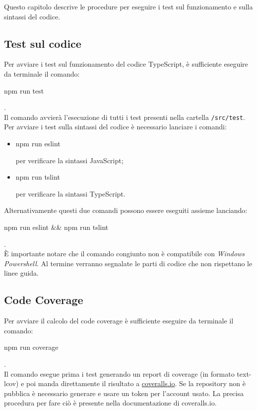 Questo capitolo descrive le procedure per eseguire i test sul funzionamento e sulla sintassi del codice.
\subsection{Test sul codice}
Per avviare i test sul funzionamento del codice TypeScript, è sufficiente eseguire da terminale il comando:
\\[0.2cm]
\hspace*{10mm}
\begin{ttfamily}
	npm run test
\end{ttfamily}.
\\[0.2cm]
Il comando avvierà l'esecuzione di tutti i test presenti nella cartella \texttt{/src/test}.
Per avviare i test sulla sintassi del codice è necessario lanciare i comandi:
\begin{itemize}
	\item \begin{ttfamily}npm run eslint\end{ttfamily} per verificare la sintassi JavaScript;
	\item \begin{ttfamily}npm run tslint\end{ttfamily}
	per verificare la sintassi TypeScript.
\end{itemize}
Alternativamente questi due comandi possono essere eseguiti assieme lanciando:\\[0.2cm]
\hspace*{10mm}
\begin{ttfamily}
npm run eslint \&\& npm run tslint
\end{ttfamily}.
\\[0.2cm]
È importante notare che il comando congiunto non è compatibile con \emph{Windows Powershell}.
Al termine verranno segnalate le parti di codice che non rispettano le linee guida.

\subsection{Code Coverage}
Per avviare il calcolo del code coverage è sufficiente eseguire da terminale il comando:
\\[0.2cm]
\hspace*{10mm}
\begin{ttfamily}
	npm run coverage
\end{ttfamily}.
\\[0.2cm]
Il comando esegue prima i test generando un report di coverage (in formato text-lcov) e poi manda direttamente il risultato a \href{https://coveralls.io/}{coveralls.io}.
Se la repository non è pubblica è necessario generare e usare un token per l'account usato. La precisa procedura per fare ciò è presente nella documentazione di coveralls.io.